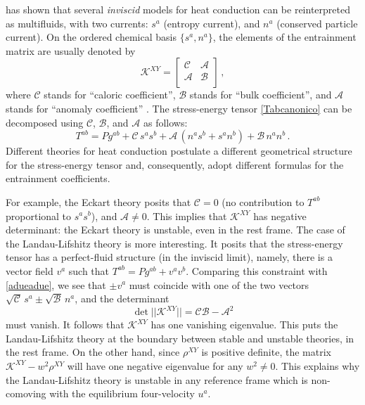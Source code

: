\documentclass[a4paper, amsfonts, amssymb, amsmath, reprint, showkeys, nofootinbib, twoside, onecolumn,notitlepage]{revtex4-1}
\theoremstyle{definition}
\theoremstyle{theorem}
\begin{document}
\citet{noto_rel} has shown that several \textit{inviscid} models for heat conduction can be reinterpreted as multifluids, with two currents: $s^a$ (entropy current), and $n^a$ (conserved particle current). On the ordered chemical basis $\{ s^a, n^a \}$, the elements of the entrainment matrix are usually denoted by
\begin{equation}
\mathcal{K}^{XY}=
\begin{bmatrix}
   \mathcal{C} & \mathcal{A}  \\
    \mathcal{A} & \mathcal{B}  \\
\end{bmatrix} \, ,
\end{equation} 
where $\mathcal{C}$ stands for ``caloric coefficient'', $\mathcal{B}$ stands for ``bulk coefficient'', and $\mathcal{A}$ stands for ``anomaly coefficient'' \cite{cool1995}. The stress-energy tensor \eqref{Tabcanonico} can be decomposed using $\mathcal{C}$, $\mathcal{B}$, and $\mathcal{A}$ as follows:
\begin{equation}\label{adueadue}
T^{ab}= P g^{ab} + \mathcal{C} \, s^a s^b + \mathcal{A} \, (n^a s^b+s^a n^b) + \mathcal{B} \, n^a n^b \, .
\end{equation}
Different theories for heat conduction postulate a different geometrical structure for the stress-energy tensor and, consequently, adopt different formulas for the entrainment coefficients. 

For example, the Eckart theory \cite{Eckart40} posits that $\mathcal{C}=0$ (no contribution to $T^{ab}$ proportional to $s^a s^b$), and $\mathcal{A} \neq 0$. This implies that $\mathcal{K}^{XY}$ has negative determinant: the Eckart theory is unstable, even in the rest frame. The case of the Landau-Lifshitz theory \cite{landau6} is more interesting. It posits that the stress-energy tensor has a perfect-fluid structure (in the inviscid limit), namely, there is a vector field $v^a$ such that $T^{ab}=P g^{ab}+v^a v^b$. Comparing this constraint with \eqref{adueadue}, we see that $\pm v^a$ must coincide with one of the two vectors $\sqrt{\mathcal{C}} \, s^a \pm \sqrt{\mathcal{B}} \, n^a$, and the determinant
\begin{equation}
\det || \mathcal{K}^{XY} || = \mathcal{C}\mathcal{B}-\mathcal{A}^2
\end{equation}
must vanish. It follows that $\mathcal{K}^{XY}$ has one vanishing eigenvalue. This puts the Landau-Lifshitz theory at the boundary between stable and unstable theories, in the rest frame. On the other hand, since $\rho^{XY}$ is positive definite, the matrix $\mathcal{K}^{XY}- w^2 \rho^{XY}$ will have one negative eigenvalue for any $w^2 \neq 0$. This explains why the Landau-Lifshitz theory is unstable in any reference frame which is non-comoving with the equilibrium four-velocity $u^a$.
\end{document}
